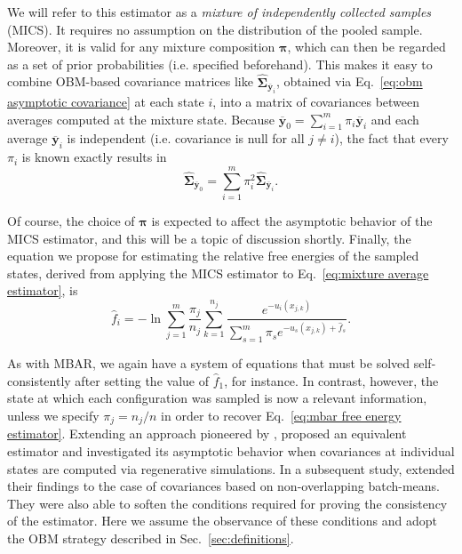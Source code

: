 \documentclass[
    journal=jctcce,
    layout=twocolumn
]{achemso}
\newcommand{\mt}[1]{\boldsymbol{\mathbf{#1}}}   %
\newcommand{\vt}[1]{\boldsymbol{\mathbf{#1}}}   %
\newcommand{\avg}[1]{\overline{#1}}             %
\begin{document}
We will refer to this estimator as a \textit{mixture of independently collected samples} (MICS). It requires no assumption on the distribution of the pooled sample. Moreover, it is valid for any mixture composition $\vt \pi$, which can then be regarded as a set of prior probabilities (i.e. specified beforehand). This makes it easy to combine OBM-based covariance matrices like $\hat{\mt \Sigma}_{\avg{\vt y}_i}$, obtained via Eq.~\eqref{eq:obm asymptotic covariance} at each state $i$, into a matrix of covariances between averages computed at the mixture state. Because $\avg{\vt y}_0 = \sum_{i=1}^m \pi_i \avg{\vt y}_i$ and each average $\avg{\vt y}_i$ is independent (i.e. covariance is null for all $j \neq i$), the fact that every $\pi_i$ is known exactly results in
\begin{equation}
\label{eq:mixture variance estimator}
\hat{\mt \Sigma}_{\avg{\vt y}_0} = \sum_{i=1}^m \pi_i^2 \hat{\mt \Sigma}_{\avg{\vt y}_i}.
\end{equation}

Of course, the choice of $\vt \pi$ is expected to affect the asymptotic behavior of the MICS estimator, and this will be a topic of discussion shortly. Finally, the equation we propose for estimating the relative free energies of the sampled states, derived from applying the MICS estimator to Eq.~\eqref{eq:mixture average estimator}, is
\begin{equation}
\label{eq:mics free energy estimator}
{\hat f}_i = -\ln \sum_{j=1}^m \frac{\pi_j}{n_j} \sum_{k=1}^{n_j} \frac{e^{-u_i(x_{j,k})}}{\sum_{s=1}^m \pi_s e^{-u_s(x_{j,k}) + {\hat f}_s}}.
\end{equation}

As with MBAR, we again have a system of equations that must be solved self-consistently after setting the value of $\hat f_1$, for instance. In contrast, however, the state at which each configuration was sampled is now a relevant information, unless we specify $\pi_j = {n_j}/{n}$ in order to recover Eq.~\eqref{eq:mbar free energy estimator}. Extending an approach pioneered by \citeauthor{Geyer_1994} \cite{Geyer_1994}, \citeauthor{Doss_2014} \cite{Doss_2014} proposed an equivalent estimator and investigated its asymptotic behavior when covariances at individual states are computed via regenerative simulations. In a subsequent study, \citeauthor{Roy_2018} \cite{Roy_2018} extended their findings to the case of covariances based on non-overlapping batch-means. They were also able to soften the conditions required for proving the consistency of the estimator. Here we assume the observance of these conditions and adopt the OBM strategy described in Sec.~\ref{sec:definitions}. 
\end{document}
